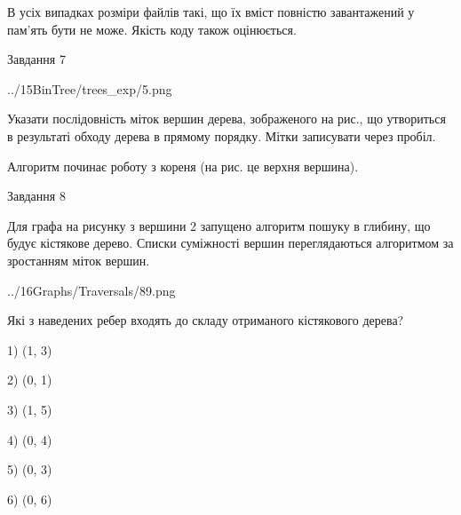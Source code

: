 \documentclass[12pt, ukrainian]{article}
\begin{document}
{В усіх випадках розміри файлів такі, що їх вміст повністю завантажений у пам'ять бути не може. Якість коду також оцінюється.



\vspace{10mm}\par

\newpage
\begin{minipage}[t]{9.7cm}
               
{\begin{center}Завдання {7}\end{center}}
\vspace{-4mm}

\begin{center}
	{../15BinTree/trees_exp/5.png}
\end{center}
Указати послідовність міток вершин дерева, зображеного на рис., що утвориться в результаті обходу дерева в прямому порядку. Мітки записувати через пробіл.\par Алгоритм починає роботу з кореня (на рис. це верхня вершина).\par

\end{minipage}
\vline \hspace{8mm}
\begin{minipage}[t]{8.0cm}
               
{\begin{center}Завдання {8}\end{center}}
\vspace{-4mm}
Для графа на рисунку з вершини 2 запущено алгоритм пошуку в глибину, що будує кістякове дерево. Списки суміжності вершин переглядаються алгоритмом за зростанням міток вершин.\par
\begin{center}
	{../16Graphs/Traversals/89.png}
\end{center}
\par Які з наведених ребер входять до складу отриманого кістякового дерева?\par
1) (1, 3)\par
2) (0, 1)\par
3) (1, 5)\par
4) (0, 4)\par
5) (0, 3)\par
6) (0, 6)\par
{\vskip 15pt} \par


\end{minipage}}
\end{document}
